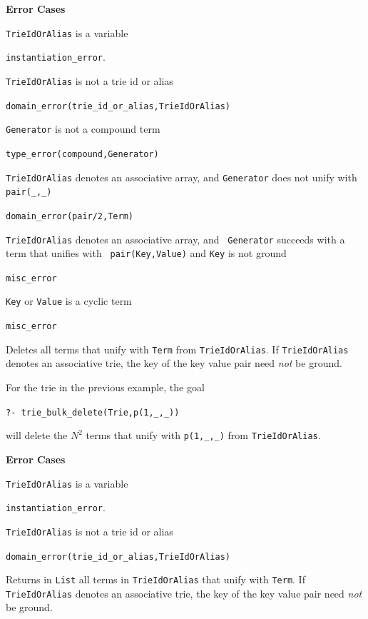 \begin{description}
{\bf Error Cases}
\bi
\item 	{\tt TrieIdOrAlias} is a variable
\bi
\item 	{\tt instantiation\_error}.
\ei
\item 	{\tt TrieIdOrAlias} is not a trie id or alias
\bi
\item 	{\tt domain\_error(trie\_id\_or\_alias,TrieIdOrAlias)}
\ei
\item   {\tt Generator} is not a compound term
\bi
\item   {\tt type\_error(compound,Generator)}
\ei
\item 	{\tt TrieIdOrAlias} denotes an associative array, and {\tt Generator} 
  does not unify with {\tt pair(\_,\_)} 
\bi
\item 	{\tt domain\_error(pair/2,Term)}
\ei
\item {\tt TrieIdOrAlias} denotes an associative array, and {\tt
  Generator} succeeds with a term that unifies with {\tt
  pair(Key,Value)} and {\tt Key} is not ground 
\bi
\item 	{\tt misc\_error}
\ei
\item {\tt Key} or {\tt Value} is a cyclic term
\bi
\item 	{\tt misc\_error}
\ei
\ei

% 
Deletes all terms that unify with {\tt Term} from {\tt TrieIdOrAlias}.
If {\tt TrieIdOrAlias} denotes an associative trie, the key of the key
value pair need {\em not} be ground.

\begin{example}\label{ex:bulk-delete} \rm
For the trie in the previous example, the goal 
\begin{center}
{\tt ?-  trie\_bulk\_delete(Trie,p(1,\_,\_))} 
\end{center}
will delete the $N^2$ terms that unify with {\tt p(1,\_,\_)} from {\tt TrieIdOrAlias}.
\end{example}

{\bf Error Cases}
\bi
\item 	{\tt TrieIdOrAlias} is a variable
\bi
\item 	{\tt instantiation\_error}.
\ei
\item 	{\tt TrieIdOrAlias} is not a trie id or alias
\bi
\item 	{\tt domain\_error(trie\_id\_or\_alias,TrieIdOrAlias)}
\ei
\ei

% 
Returns in {\tt List} all terms in {\tt TrieIdOrAlias} that unify with
{\tt Term}.  If {\tt TrieIdOrAlias} denotes an associative trie, the
key of the key value pair need {\em not} be ground.


\end{description}
